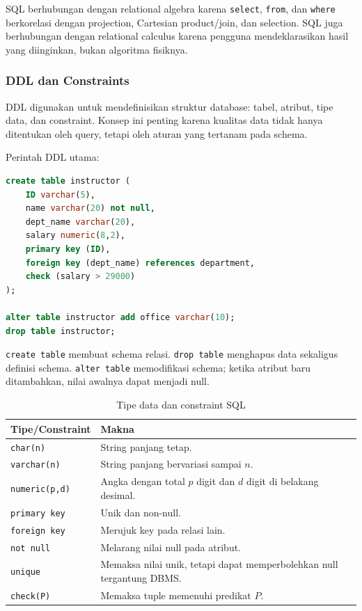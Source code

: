 SQL berhubungan dengan relational algebra karena \texttt{select}, \texttt{from}, dan \texttt{where} berkorelasi dengan projection, Cartesian product/join, dan selection. SQL juga berhubungan dengan relational calculus karena pengguna mendeklarasikan hasil yang diinginkan, bukan algoritma fisiknya.

\subsubsection{DDL dan Constraints}

\begin{jawab}
DDL digunakan untuk mendefinisikan struktur database: tabel, atribut, tipe data, dan constraint. Konsep ini penting karena kualitas data tidak hanya ditentukan oleh query, tetapi oleh aturan yang tertanam pada schema.
\end{jawab}

Perintah DDL utama:
\begin{lstlisting}[language=SQL, caption={Contoh DDL SQL}, label={lst:sql-ddl}]
create table instructor (
    ID varchar(5),
    name varchar(20) not null,
    dept_name varchar(20),
    salary numeric(8,2),
    primary key (ID),
    foreign key (dept_name) references department,
    check (salary > 29000)
);

alter table instructor add office varchar(10);
drop table instructor;
\end{lstlisting}

\texttt{create table} membuat schema relasi. \texttt{drop table} menghapus data sekaligus definisi schema. \texttt{alter table} memodifikasi schema; ketika atribut baru ditambahkan, nilai awalnya dapat menjadi null.

\begin{table}[H]
\centering
\begin{tabularx}{\textwidth}{|L{0.20\textwidth}|X|}
\hline
\textbf{Tipe/Constraint} & \textbf{Makna} \\
\hline
\texttt{char(n)} & String panjang tetap. \\
\hline
\texttt{varchar(n)} & String panjang bervariasi sampai \(n\). \\
\hline
\texttt{numeric(p,d)} & Angka dengan total \(p\) digit dan \(d\) digit di belakang desimal. \\
\hline
\texttt{primary key} & Unik dan non-null. \\
\hline
\texttt{foreign key} & Merujuk key pada relasi lain. \\
\hline
\texttt{not null} & Melarang nilai null pada atribut. \\
\hline
\texttt{unique} & Memaksa nilai unik, tetapi dapat memperbolehkan null tergantung DBMS. \\
\hline
\texttt{check(P)} & Memaksa tuple memenuhi predikat \(P\). \\
\hline
\end{tabularx}
\caption{Tipe data dan constraint SQL}
\label{tab:sql-types-constraints}
\end{table}


